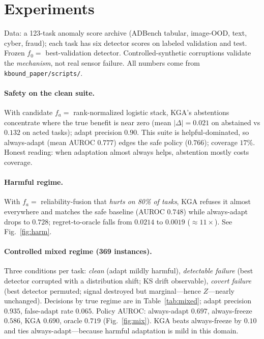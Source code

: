 \documentclass[11pt]{article}
\theoremstyle{plain}
\theoremstyle{definition}
\begin{document}
\section{Experiments}\label{sec:exp}
Data: a 123-task anomaly score archive (ADBench tabular, image-OOD, text, cyber,
fraud); each task has six detector scores on labeled validation and test. Frozen
$f_0=$ best-validation detector. Controlled-synthetic corruptions validate the
\emph{mechanism}, not real sensor failure. All numbers come from
\texttt{kbound\_paper/scripts/}.

\paragraph{Safety on the clean suite.} With candidate $f_a=$ rank-normalized logistic
stack, \textsc{KGA}'s abstentions concentrate where the true benefit is near zero
(mean $|\Delta|=0.021$ on abstained vs $0.132$ on acted tasks); adapt precision $0.90$.
This suite is helpful-dominated, so always-adapt (mean AUROC $0.777$) edges the safe
policy ($0.766$); coverage $17\%$. Honest reading: when adaptation almost always helps,
abstention mostly costs coverage.

\paragraph{Harmful regime.} With $f_a=$ reliability-fusion that \emph{hurts on 80\% of
tasks}, \textsc{KGA} refuses it almost everywhere and matches the safe baseline
(AUROC $0.748$) while always-adapt drops to $0.728$; regret-to-oracle falls from
$0.0214$ to $0.0019$ ($\approx11\times$). See Fig.~\ref{fig:harm}.

\paragraph{Controlled mixed regime (369 instances).} Three conditions per task:
\emph{clean} (adapt mildly harmful), \emph{detectable failure} (best detector
corrupted with a distribution shift; KS drift observable), \emph{covert failure} (best
detector permuted; signal destroyed but marginal---hence $Z$---nearly unchanged).
Decisions by true regime are in Table~\ref{tab:mixed}; adapt precision $0.935$,
false-adapt rate $0.065$. Policy AUROC: always-adapt $0.697$, always-freeze $0.586$,
\textsc{KGA} $0.690$, oracle $0.719$ (Fig.~\ref{fig:mix}). \textsc{KGA} beats
always-freeze by $0.10$ and ties always-adapt---because harmful adaptation is mild in
this domain.
\end{document}
